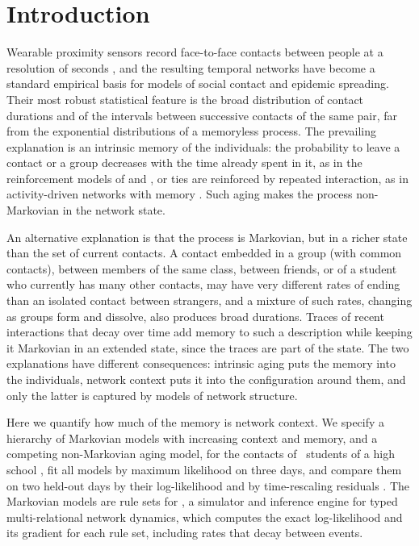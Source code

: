 \section{Introduction}\label{sec:intro}

Wearable proximity sensors record face-to-face contacts between people at a resolution of seconds \citep{cattuto2010,stehle2011}, and the resulting temporal networks \citep{holme2012} have become a standard empirical basis for models of social contact and epidemic spreading.
Their most robust statistical feature is the broad distribution of contact durations and of the intervals between successive contacts of the same pair, far from the exponential distributions of a memoryless process.
The prevailing explanation is an intrinsic memory of the individuals: the probability to leave a contact or a group decreases with the time already spent in it, as in the reinforcement models of \citet{zhao2011} and \citet{starnini2013}, or ties are reinforced by repeated interaction, as in activity-driven networks with memory \citep{karsai2014}.
Such aging makes the process non-Markovian in the network state.

An alternative explanation is that the process is Markovian, but in a richer state than the set of current contacts.
A contact embedded in a group (with common contacts), between members of the same class, between friends, or of a student who currently has many other contacts, may have very different rates of ending than an isolated contact between strangers, and a mixture of such rates, changing as groups form and dissolve, also produces broad durations.
Traces of recent interactions that decay over time add memory to such a description while keeping it Markovian in an extended state, since the traces are part of the state.
The two explanations have different consequences: intrinsic aging puts the memory into the individuals, network context puts it into the configuration around them, and only the latter is captured by models of network structure.

Here we quantify how much of the memory is network context.
We specify a hierarchy of Markovian models with increasing context and memory, and a competing non-Markovian aging model, for the contacts of \Students\ students of a high school \citep{mastrandrea2015}, fit all models by maximum likelihood on three days, and compare them on two held-out days by their log-likelihood and by time-rescaling residuals \citep{brown2002}.
The Markovian models are rule sets for \tricl, a simulator and inference engine for typed multi-relational network dynamics, which computes the exact log-likelihood and its gradient for each rule set, including rates that decay between events.

